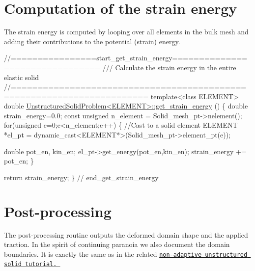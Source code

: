  

\hypertarget{index_strain}{}\section{Computation of the strain energy}\label{index_strain}
The strain energy is computed by looping over all elements in the bulk mesh and adding their contributions to the potential (strain) energy.

 
\begin{DoxyCodeInclude}
\textcolor{comment}{//================start\_get\_strain\_energy================================}
\textcolor{comment}{/// Calculate the strain energy in the entire elastic solid}
\textcolor{comment}{}\textcolor{comment}{//=======================================================================}
\textcolor{keyword}{template}<\textcolor{keyword}{class} ELEMENT>
\textcolor{keywordtype}{double} \hyperlink{classUnstructuredSolidProblem_a4da918a1f0cf94ebccc5112b58c28ece}{UnstructuredSolidProblem<ELEMENT>::get\_strain\_energy}
      ()
\{
 \textcolor{keywordtype}{double} strain\_energy=0.0;
 \textcolor{keyword}{const} \textcolor{keywordtype}{unsigned} n\_element = Solid\_mesh\_pt->nelement();
 \textcolor{keywordflow}{for}(\textcolor{keywordtype}{unsigned} e=0;e<n\_element;e++)
  \{
   \textcolor{comment}{//Cast to a solid element}
   ELEMENT *el\_pt = \textcolor{keyword}{dynamic\_cast<}ELEMENT*\textcolor{keyword}{>}(Solid\_mesh\_pt->element\_pt(e));
   
   \textcolor{keywordtype}{double} pot\_en, kin\_en;
   el\_pt->get\_energy(pot\_en,kin\_en);
   strain\_energy += pot\_en;
  \}
 
 \textcolor{keywordflow}{return} strain\_energy;
\} \textcolor{comment}{// end\_get\_strain\_energy}

\end{DoxyCodeInclude}




 

\hypertarget{index_doc}{}\section{Post-\/processing}\label{index_doc}
The post-\/processing routine outputs the deformed domain shape and the applied traction. In the spirit of continuing paranoia we also document the domain boundaries. It is exactly the same as in the related \href{../../unstructured_solid/html/index.html}{\tt non-\/adaptive unstructured solid tutorial. }



